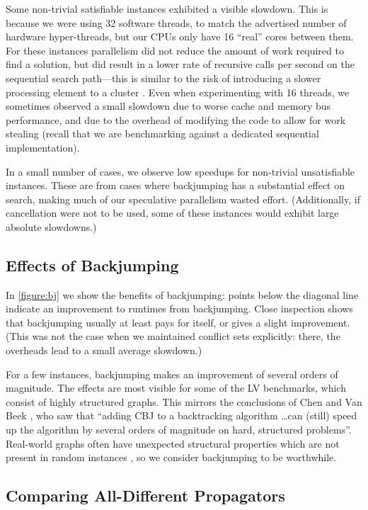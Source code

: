 \documentclass{llncs}
\begin{document}
Some non-trivial satisfiable instances exhibited a visible slowdown. This is because we were using
32 software threads, to match the advertised number of hardware hyper-threads, but our CPUs only
have 16 ``real'' cores between them. For these instances parallelism did not reduce the amount of
work required to find a solution, but did result in a lower rate of recursive calls per second on
the sequential search path---this is similar to the risk of introducing a slower processing element
to a cluster \cite{Trienekens:1990}. Even when experimenting with 16 threads, we sometimes observed
a small slowdown due to worse cache and memory bus performance, and due to the overhead of modifying
the code to allow for work stealing (recall that we are benchmarking against a dedicated sequential
implementation).

In a small number of cases, we observe low speedups for non-trivial unsatisfiable instances. These
are from cases where backjumping has a substantial effect on search, making much of our speculative
parallelism wasted effort. (Additionally, if cancellation were not to be used, some of these
instances would exhibit large absolute slowdowns.)

\subsection{Effects of Backjumping}

In \cref{figure:bj} we show the benefits of backjumping: points below the diagonal line indicate an
improvement to runtimes from backjumping. Close inspection shows that backjumping usually at least
pays for itself, or gives a slight improvement. (This was not the case when we maintained conflict
sets explicitly: there, the overheads lead to a small average slowdown.)

For a few instances, backjumping makes an improvement of several orders of magnitude. The effects
are most visible for some of the LV benchmarks, which consist of highly structured graphs. This
mirrors the conclusions of Chen and Van Beek \cite{Chen:2001}, who saw that ``adding CBJ to a
backtracking algorithm \ldots can (still) speed up the algorithm by several orders of magnitude on
hard, structured problems''.  Real-world graphs often have unexpected structural properties which
are not present in random instances \cite{MacIntyre:1998,Slater:2014}, so we consider backjumping to
be worthwhile.

\subsection{Comparing All-Different Propagators}
\end{document}
